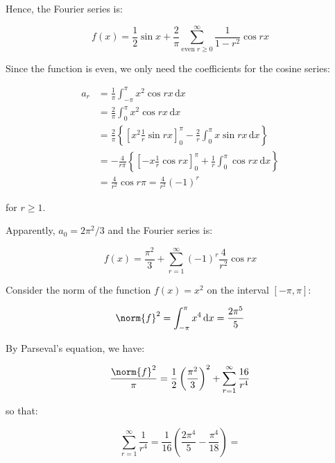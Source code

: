 \documentclass[12pt]{article}
\begin{document}
Hence, the Fourier series is:

\begin{equation}
    f(x) = \frac{1}{2} \sin{x} + \frac{2}{\pi} \sum_{\text{even }r \ge 0}^{\infty} \frac{1}{1 - r^{2}} \cos{rx}
\end{equation}

Since the function is even, we only need the coefficients for the cosine series:

\begin{equation}
\begin{split}
    a_{r} &= \frac{1}{\pi} \int_{-\pi}^{\pi} x^{2} \cos{rx} \, \mathrm{d}x \\
    &= \frac{2}{\pi} \int_{0}^{\pi} x^{2} \cos{rx} \, \mathrm{d}x \\
    &= \frac{2}{\pi} \left\{ \left[ x^{2} \frac{1}{r} \sin{rx} \right]_{0}^{\pi} -  \frac{2}{r} \int_{0}^{\pi} x \sin{rx} \, \mathrm{d}x \right\} \\
    &= -\frac{4}{r\pi} \left\{ \left[ -x \frac{1}{r} \cos{rx} \right]_{0}^{\pi} + \frac{1}{r} \int_{0}^{\pi} \cos{rx} \, \mathrm{d}x \right\} \\
    &= \frac{4}{r^{2}} \cos{r\pi} = \frac{4}{r^{2}} (-1)^{r}
\end{split}
\end{equation}

for $r \ge 1$.

Apparently, $a_{0} = 2\pi^{2}/3$ and the Fourier series is:

\begin{equation}
    f(x) = \frac{\pi^{2}}{3} + \sum_{r = 1}^{\infty} (-1)^{r} \frac{4}{r^{2}} \cos{rx}
\end{equation}

Consider the norm of the function $f(x) = x^{2}$ on the interval $[-\pi, \pi]$:

\begin{equation}
    \norm{f}^{2} = \int_{-\pi}^{\pi} x^{4} \, \mathrm{d}x = \frac{2\pi^{5}}{5}
\end{equation}

By Parseval's equation, we have:

\begin{equation}
    \frac{\norm{f}^{2}}{\pi} = \frac{1}{2} \left( \frac{\pi^{2}}{3} \right)^{2} + \sum_{r = 1}^{\infty} \frac{16}{r^{4}}
\end{equation}

so that:

\begin{equation}
    \sum_{r = 1}^{\infty} \frac{1}{r^{4}} = \frac{1}{16} \left( \frac{2\pi^{4}}{5} - \frac{\pi^{4}}{18} \right) = 
\end{equation}
\end{document}
